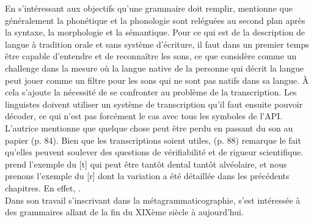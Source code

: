 En s'intéressant aux objectifs qu'une grammaire doit remplir, \citeauthor{riceSoundsGrammarWriting2014} mentionne que généralement la phonétique et la phonologie sont reléguées au second plan après la syntaxe, la morphologie et la sémantique. Pour ce qui est de la description de langue à tradition orale et sans système d'écriture, il faut dans un premier temps être capable d'entendre et de reconnaître les sons, ce que \citeauthor{riceSoundsGrammarWriting2014} considère comme un challenge dans la mesure où la langue native de la personne qui décrit la langue peut jouer comme un filtre pour les sons qui ne sont pas natifs dans sa langue. À cela s'ajoute la nécessité de se confronter au problème de la transcription. Les linguistes doivent utiliser un système de transcription qu'il faut ensuite pouvoir décoder, ce qui n'est pas forcément le cas avec tous les symboles de l'API. L'autrice mentionne que quelque chose peut être perdu en passant du son au papier (p. 84). Bien que les transcriptions soient utiles, \citeauthor{riceSoundsGrammarWriting2014} (p. 88) remarque le fait qu'elles peuvent soulever des questions de vérifiabilité et de rigueur scientifique. \citeauthor{riceSoundsGrammarWriting2014} prend l'exemple du [t] qui peut être tantôt dental tantôt alvéolaire, et nous prenons l'exemple du [r] dont la variation a été détaillée dans les précédents chapitres. En effet,  \parencite[74]{riceSoundsGrammarWriting2014}.\\

Dans son travail s'inscrivant dans la métagrammaticographie, \citeauthor{riceSoundsGrammarWriting2014} s'est intéressée à des grammaires allant de la fin du XIXème siècle à aujourd'hui.\\

